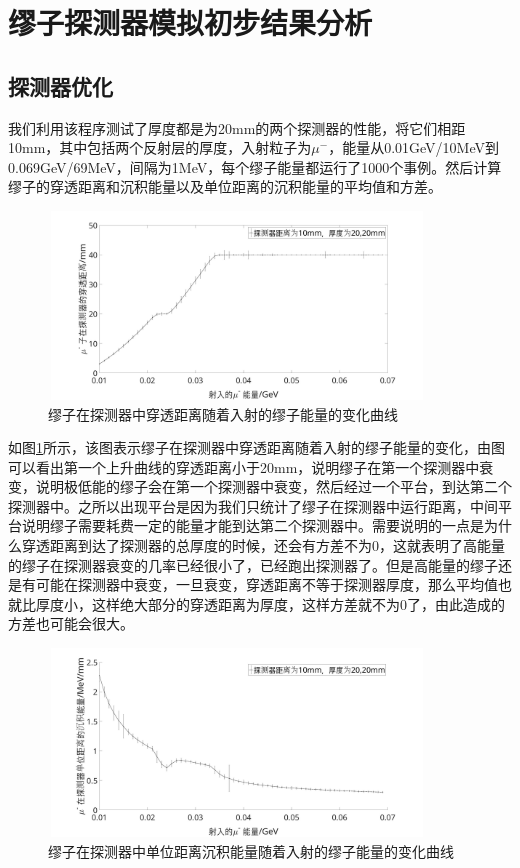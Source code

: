 \documentclass[UTF8]{ctexart}
\begin{document}
\section{缪子探测器模拟初步结果分析}
\subsection{探测器优化}

我们利用该程序测试了厚度都是为20mm的两个探测器的性能，将它们相距10mm，其中包括两个反射层的厚度，入射粒子为$\mu^-$，能量从0.01GeV/10MeV到0.069GeV/69MeV，间隔为1MeV，每个缪子能量都运行了1000个事例。然后计算缪子的穿透距离和沉积能量以及单位距离的沉积能量的平均值和方差。\\

\begin{figure}[H]
    \centering\includegraphics[width=100mm,height=50mm]{pic/de_distant_dis_10_se_20.jpg}
    \caption{缪子在探测器中穿透距离随着入射的缪子能量的变化曲线}\label{di1020}
\end{figure}


如图\ref{di1020}所示，该图表示缪子在探测器中穿透距离随着入射的缪子能量的变化，由图可以看出第一个上升曲线的穿透距离小于20mm，说明缪子在第一个探测器中衰变，说明极低能的缪子会在第一个探测器中衰变，然后经过一个平台，到达第二个探测器中。之所以出现平台是因为我们只统计了缪子在探测器中运行距离，中间平台说明缪子需要耗费一定的能量才能到达第二个探测器中。需要说明的一点是为什么穿透距离到达了探测器的总厚度的时候，还会有方差不为0，这就表明了高能量的缪子在探测器衰变的几率已经很小了，已经跑出探测器了。但是高能量的缪子还是有可能在探测器中衰变，一旦衰变，穿透距离不等于探测器厚度，那么平均值也就比厚度小，这样绝大部分的穿透距离为厚度，这样方差就不为0了，由此造成的方差也可能会很大。\\


\begin{figure}[H]
    \centering\includegraphics[width=100mm,height=50mm]{pic/de_en_di_dis_10_se_20.jpg}
    \caption{缪子在探测器中单位距离沉积能量随着入射的缪子能量的变化曲线}\label{en_di1020}
\end{figure}
\end{document}
